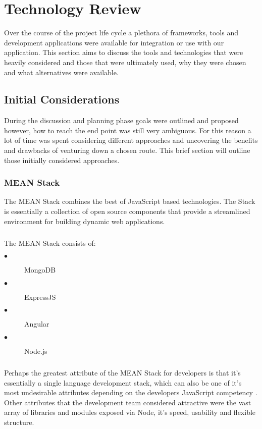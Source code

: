 \chapter{Technology Review}
Over the course of the project life cycle a plethora of frameworks, tools and development applications were available for integration or use with our application. This section aims to discuss the tools and technologies that were heavily considered and those that were ultimately used, why they were chosen and what alternatives were available. 

\section{Initial Considerations}
During the discussion and planning phase goals were outlined and proposed however, how to reach the end point was still very ambiguous. For this reason a lot of time was spent considering different approaches and uncovering the benefits and drawbacks of venturing down a chosen route. This brief section will outline those initially considered approaches.
\subsection{MEAN Stack}
The MEAN Stack combines the best of JavaScript based technologies. The Stack is essentially a collection of open source components that provide a streamlined environment for building dynamic web applications. 

\paragraph{}
The MEAN Stack consists of:

\begin{description}
  \item[$\bullet$] MongoDB
  \item[$\bullet$] ExpressJS
  \item[$\bullet$] Angular
  \item[$\bullet$] Node.js
\end{description}

\paragraph{}
Perhaps the greatest attribute of the MEAN Stack for developers is that it's essentially a single language development stack, which can also be one of it's most undesirable attributes depending on the developers JavaScript competency \cite{MEAN_STACK}. Other attributes that the development team considered attractive were the vast array of libraries and modules exposed via Node, it's speed, usability and flexible structure. 

